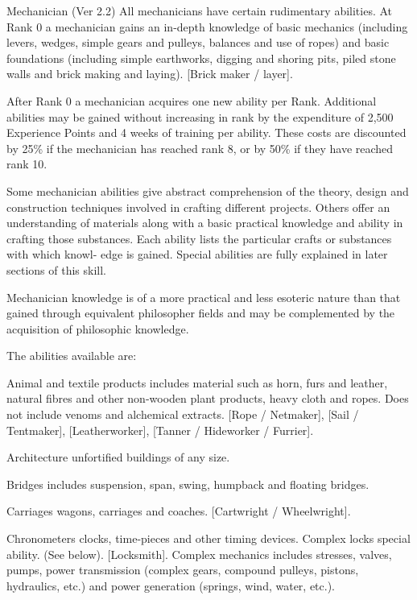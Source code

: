 \begin{Chapter}{Mechanician (Ver 2.2)}
All mechanicians have certain rudimentary abilities.  At Rank 0 a
mechanician gains an in-depth knowledge of basic mechanics (including
levers, wedges, simple gears and pulleys, balances and use of ropes)
and basic foundations (including simple earthworks, digging and
shoring pits, piled stone walls and brick making and laying).  [Brick
  maker / layer].

After Rank 0 a mechanician acquires one new ability per Rank.
Additional abilities may be gained without increasing in rank by the
expenditure of 2,500 Experience Points and 4 weeks of training per
ability.  These costs are discounted by 25\% if the mechanician has
reached rank 8, or by 50\% if they have reached rank 10.

Some mechanician abilities give abstract comprehension of the theory,
design and construction techniques involved in crafting different
projects.  Others offer an understanding of materials along with a
basic practical knowledge and ability in crafting those substances.
Each ability lists the particular crafts or substances with which
knowl- edge is gained. Special abilities are fully explained in later
sections of this skill.

Mechanician knowledge is of a more practical and less esoteric nature
than that gained through equivalent philosopher fields and may be
complemented by the acquisition of philosophic knowledge.

The abilities available are: 

\begin{Description}
  
\item[Animal] and textile products includes material such as horn,
  furs and leather, natural fibres and other non-wooden plant
  products, heavy cloth and ropes.  Does not include venoms and
  alchemical extracts.  [Rope / Netmaker], [Sail / Tentmaker],
  [Leatherworker], [Tanner / Hideworker / Furrier].

\item[Architecture] unfortified buildings of any size.

\item[Bridges]  includes  suspension,  span,  swing,  humpback and floating bridges. 

\item[Carriages] wagons, carriages and coaches.  [Cartwright /
  Wheelwright].

\item[Chronometers] clocks, time-pieces and other timing devices.
  Complex locks special ability.  (See below). [Locksmith]. Complex
  mechanics includes stresses, valves, pumps, power transmission
  (complex gears, compound pulleys, pistons, hydraulics, etc.)  and
  power generation (springs, wind, water, etc.).


\end{Description}
\end{Chapter}
